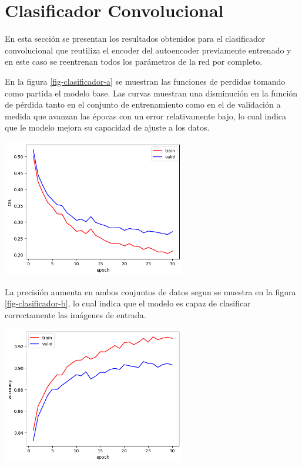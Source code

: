 \documentclass[aps,prl,reprint,groupedaddress]{revtex4-2}
\newenvironment{Figura}
  {\par\medskip\noindent\minipage{\linewidth}}
  {\endminipage\par\medskip}
\begin{document}
\section{Clasificador Convolucional}

En esta sección se presentan los resultados obtenidos para el clasificador
convolucional que reutiliza el encoder del autoencoder previamente entrenado y 
en este caso se reentrenan todos los parámetros de la red por completo.

En la figura \ref{fig-clasificador-a} se muestran las funciones de perdidas 
tomando como partida el modelo base. Las curvas muestran una disminución en la 
función de pérdida tanto en el conjunto de entrenamiento como en el de validación 
a medida que avanzan las épocas con un error relativamente bajo, lo cual 
indica que le modelo mejora su capacidad de ajuste a los datos.
\begin{Figura}
  \centering
  \includegraphics[width=0.60\textwidth]{figs1/modelo_con_clasificador_a.png}
  \label{fig-clasificador-a}
\end{Figura}

La precisión aumenta en ambos conjuntos de datos segun se muestra en la figura
\ref{fig-clasificador-b}, lo cual indica que el modelo es capaz de clasificar
correctamente las imágenes de entrada.
\begin{Figura}
  \centering
  \includegraphics[width=0.60\textwidth]{figs1/modelo_con_clasificador_b.png}
  \label{fig-clasificador-b}
\end{Figura}
\end{document}
